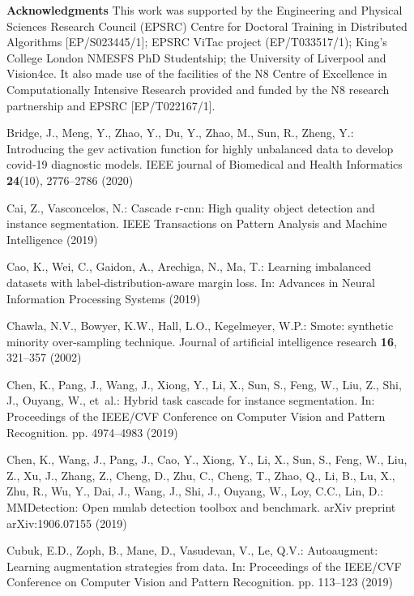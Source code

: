 \documentclass[runningheads]{llncs}
\begin{document}
\hfill \break
\noindent\textbf{Acknowledgments}
This work was supported by the Engineering and Physical Sciences Research Council (EPSRC) Centre for Doctoral Training in Distributed Algorithms [EP/S023445/1]; EPSRC ViTac project (EP/T033517/1); King's College London NMESFS PhD Studentship; the University of Liverpool and Vision4ce. It also made use of the facilities of the N8 Centre of Excellence in Computationally Intensive Research provided and funded by the N8 research partnership and EPSRC  [EP/T022167/1]. 
\begin{thebibliography}{10}
\providecommand{\url}[1]{\texttt{#1}}
\providecommand{\urlprefix}{URL }
\providecommand{\doi}[1]{https://doi.org/#1}

Bridge, J., Meng, Y., Zhao, Y., Du, Y., Zhao, M., Sun, R., Zheng, Y.:
  Introducing the gev activation function for highly unbalanced data to develop
  covid-19 diagnostic models. IEEE journal of Biomedical and Health Informatics
   \textbf{24}(10),  2776--2786 (2020)

Cai, Z., Vasconcelos, N.: Cascade r-cnn: High quality object detection and
  instance segmentation. IEEE Transactions on Pattern Analysis and Machine
  Intelligence  (2019)

Cao, K., Wei, C., Gaidon, A., Arechiga, N., Ma, T.: Learning imbalanced
  datasets with label-distribution-aware margin loss. In: Advances in Neural
  Information Processing Systems (2019)

Chawla, N.V., Bowyer, K.W., Hall, L.O., Kegelmeyer, W.P.: Smote: synthetic
  minority over-sampling technique. Journal of artificial intelligence research
   \textbf{16},  321--357 (2002)

Chen, K., Pang, J., Wang, J., Xiong, Y., Li, X., Sun, S., Feng, W., Liu, Z.,
  Shi, J., Ouyang, W., et~al.: Hybrid task cascade for instance segmentation.
  In: Proceedings of the IEEE/CVF Conference on Computer Vision and Pattern
  Recognition. pp. 4974--4983 (2019)

Chen, K., Wang, J., Pang, J., Cao, Y., Xiong, Y., Li, X., Sun, S., Feng, W.,
  Liu, Z., Xu, J., Zhang, Z., Cheng, D., Zhu, C., Cheng, T., Zhao, Q., Li, B.,
  Lu, X., Zhu, R., Wu, Y., Dai, J., Wang, J., Shi, J., Ouyang, W., Loy, C.C.,
  Lin, D.: {MMDetection}: Open mmlab detection toolbox and benchmark. arXiv
  preprint arXiv:1906.07155  (2019)

Cubuk, E.D., Zoph, B., Mane, D., Vasudevan, V., Le, Q.V.: Autoaugment: Learning
  augmentation strategies from data. In: Proceedings of the IEEE/CVF Conference
  on Computer Vision and Pattern Recognition. pp. 113--123 (2019)


\end{thebibliography}
\end{document}
